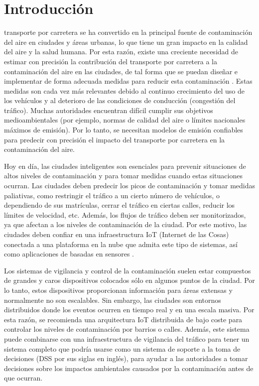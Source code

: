 \chapter{Introducción}
 transporte por carretera se ha convertido en la principal fuente de contaminación del aire en ciudades y áreas urbanas, lo que tiene un gran impacto en la calidad del aire y la salud humana. Por esta razón, existe una creciente necesidad de estimar con precisión la contribución del transporte por carretera a la contaminación del aire en las ciudades, de tal forma que se puedan diseñar e implementar de forma adecuada medidas para reducir esta contaminación \cite{SNB10}. Estas medidas son cada vez más relevantes debido al continuo crecimiento del uso de los vehículos y al deterioro de las condiciones de conducción (congestión del tráfico). Muchas autoridades encuentran difícil cumplir sus objetivos medioambientales (por ejemplo, normas de calidad del aire o límites nacionales máximos de emisión). Por lo tanto, se necesitan modelos de emisión confiables para predecir con precisión el impacto del transporte por carretera en la contaminación del aire.

Hoy en día, las ciudades inteligentes son esenciales para prevenir situaciones de altos niveles de contaminación y para tomar medidas cuando estas situaciones ocurran. Las ciudades deben predecir los picos de contaminación y tomar medidas paliativas, como restringir el tráfico a un cierto número de vehículos, o dependiendo de sus matrículas, cerrar el tráfico en ciertas calles, reducir los límites de velocidad, etc. Además, los flujos de tráfico deben ser monitorizados, ya que afectan a los niveles de contaminación de la ciudad. Por este motivo, las ciudades deben confiar en una infraestructura \ac{IoT} (Internet de las Cosas) conectada a una plataforma en la nube que admita este tipo de sistemas, así como aplicaciones de  basadas en sensores \cite{Bib18}.

Los sistemas de vigilancia y control de la contaminación suelen estar compuestos de grandes y caros dispositivos colocados sólo en algunos puntos de la ciudad. Por lo tanto, estos dispositivos proporcionan información para áreas extensas y normalmente no son escalables. Sin embargo, las ciudades son entornos distribuidos donde los eventos ocurren en tiempo real y en una escala masiva. Por esta razón, se recomienda una arquitectura \ac{IoT} distribuida de bajo coste para controlar los niveles de contaminación por barrios o calles. Además, este sistema puede combinarse con una infraestructura de vigilancia del tráfico para tener un sistema completo que podría usarse como un sistema de soporte a la toma de decisiones (\ac{DSS} por sus siglas en inglés), para ayudar a las autoridades a tomar decisiones sobre los impactos ambientales causados por la contaminación antes de que ocurran.

